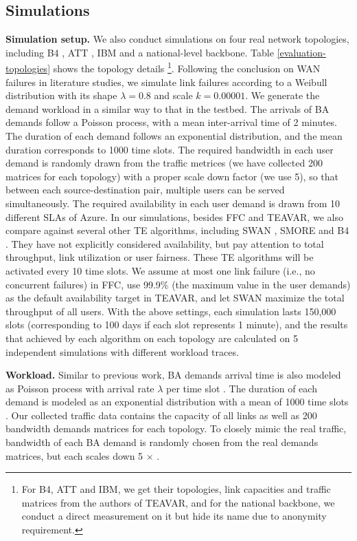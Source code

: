 \documentclass[sigconf]{acmart}
\begin{document}
\subsection{Simulations}
\textbf{Simulation setup.} 
We also conduct simulations on four real network topologies, including B4 \cite{B4}, ATT \cite{Teavar}, IBM\cite{SMORE} and a national-level backbone. 
Table \ref{evaluation-topologies} shows the topology details
\footnote{For B4, ATT and IBM, we get their topologies, link capacities and traffic matrices from the authors of TEAVAR\cite{Teavar}, and for the national backbone, we conduct a direct measurement on it but hide its name due to anonymity requirement.}. 
Following the conclusion on WAN failures in literature studies\cite{Characterization, Teavar}, 
we simulate link failures according to a Weibull distribution with its shape $\lambda=0.8$ and scale $k=0.00001$. 
We generate the demand workload in a similar way to that in the testbed. 
The arrivals of BA demands follow a Poisson process, with a mean inter-arrival time of 2 minutes. 
The duration of each demand follows an exponential distribution, and the mean duration corresponds to 1000 time slots.
The required bandwidth in each user demand is randomly drawn from the traffic metrices (we have collected 200 matrices for each topology) with a proper scale down factor (we use 5), so that between each source-destination pair, multiple users can be served simultaneously. 
The required availability in each user demand is drawn from 10 different SLAs of Azure\cite{azure}.
In our simulations, besides FFC and TEAVAR, we also compare against several other TE algorithms,  
including SWAN \cite{swan}, SMORE \cite{SMORE} and B4 \cite{B4}. 
They have not explicitly considered availability, but pay attention to 
total throughput, link utilization or user fairness. 
These TE algorithms will be activated every 10 time slots.
We assume at most one link failure (i.e., no concurrent failures) in FFC,  
use 99.9\% (the maximum value in the user demands) as the default availability target in TEAVAR,
and let SWAN maximize the total throughput of all users. 
With the above settings, each simulation lasts 150,000 slots (corresponding to 100 days if each slot represents 1 minute), and the results that achieved by each algorithm on each topology are calculated on 5 independent simulations with different workload traces. 


\iffalse
\textbf{Workload.} 
Similar to previous work\cite{OWAN,Guaranteeings,Online-deadline,Teavar}, 
BA demands arrival time is also modeled as Poisson process with arrival rate $\lambda$ per time slot \cite{Guaranteeings,Online-deadline}.
The duration of each demand is modeled as an exponential distribution with a mean of 1000 time slots \cite{Guaranteeings}.
Our collected traffic data contains the capacity of all links as well as 200 bandwidth demands matrices for each topology.
To closely mimic the real traffic, bandwidth of each BA demand is randomly chosen from the real demands matrices, but each scales down 5 $\times$ \cite{Teavar}.
\end{document}
